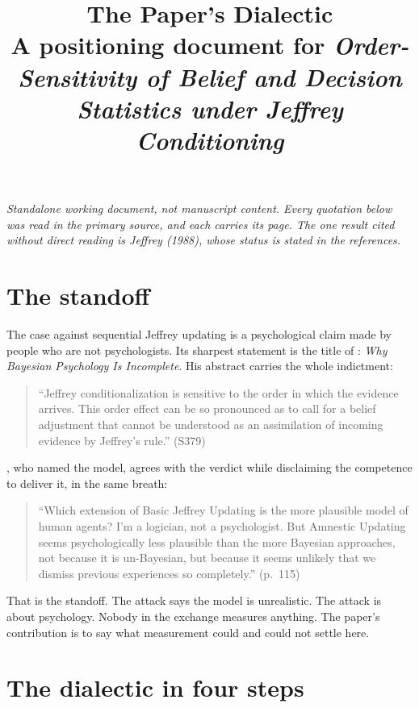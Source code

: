 \documentclass[11pt,a4paper]{article}
\title{The Paper's Dialectic\\
\large A positioning document for \emph{Order-Sensitivity of Belief and Decision
Statistics under Jeffrey Conditioning}}
\author{}
\date{}
\begin{document}
\maketitle
\vspace{-2.4em}

\begin{center}\small\itshape
Standalone working document, not manuscript content. Every quotation below was
read in the primary source, and each carries its page. The one result cited
without direct reading is Jeffrey (1988), whose status is stated in the
references.
\end{center}

\section*{The standoff}

The case against sequential Jeffrey updating is a psychological claim made by
people who are not psychologists. Its sharpest statement is the title of
\citet{Doring1999}: \emph{Why Bayesian Psychology Is Incomplete}. His abstract
carries the whole indictment:

\begin{quote}
``Jeffrey conditionalization is sensitive to the order in which the evidence
arrives. This order effect can be so pronounced as to call for a belief
adjustment that cannot be understood as an assimilation of incoming evidence by
Jeffrey's rule.'' (S379)
\end{quote}

\citet{Hawthorne2004}, who named the model, agrees with the verdict while
disclaiming the competence to deliver it, in the same breath:

\begin{quote}
``Which extension of Basic Jeffrey Updating is the more plausible model of human
agents? I'm a logician, not a psychologist. But Amnestic Updating seems
psychologically less plausible than the more Bayesian approaches, not because it
is un-Bayesian, but because it seems unlikely that we dismiss previous
experiences so completely.'' (p.~115)
\end{quote}

That is the standoff. The attack says the model is unrealistic. The attack is
about psychology. Nobody in the exchange measures anything. The paper's
contribution is to say what measurement could and could not settle here.

\section*{The dialectic in four steps}
\end{document}
